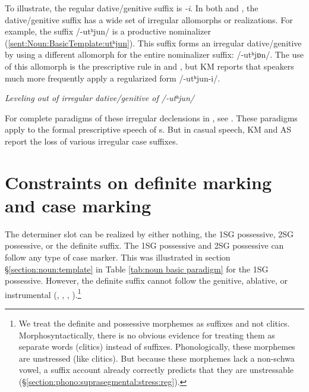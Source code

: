 To illustrate, the regular dative/genitive suffix is \textit{-i}. In both {\seaSE} and {\iaIA}, the dative/genitive suffix has a wide set of irregular allomorphs or realizations. For example, the suffix  /{-utʰjun}/ is a productive nominalizer (\ref{sent:Noun:BasicTemplate:utʰjun}). This suffix forms an irregular dative/genitive by using a different allomorph for the entire nominalizer suffix:  /{-utʰjɒn}/. The use of this    allomorph is the prescriptive rule in {\seaSE} and {\iaIA}, but KM reports that {\iaIA} speakers much more frequently apply a regularized form /{-utʰjun-i}/. 



\begin{exe}
	\ex \textit{Leveling out of irregular dative/genitive of /{-utʰjun}/}
	\label{sent:Noun:BasicTemplate:utʰjun}
	
\end{exe}

For complete paradigms of these irregular declensions in {\seaSEA}, see \citet[\S2.1.2]{DumTragut-2009-ArmenianReferenceGrammar}. These paradigms apply to the formal prescriptive speech of {\iaIA}s.  But in casual speech, KM and AS report the loss of   various irregular case suffixes. 
\section{Constraints on definite marking and case marking}\label{section:noun:caseDefConstraint}


The determiner slot can be realized by either nothing, the 1SG possessive, 2SG possessive, or the definite suffix. The 1SG possessive  and 2SG possessive  can follow any type of case marker. This was illustrated in section \S\ref{section:noun:template} in Table \ref{tab:noun basic paradigm} for the 1SG possessive. However, the definite suffix cannot follow the genitive, ablative, or instrumental (\citealt[104]{DumTragut-2009-ArmenianReferenceGrammar}, \citealt[7]{Yeghiazaryan-2010-ArmenianCase}, \citealt[48]{Hodgson-2019-DissRelativeClauseArmenianSyntax}, \citeyear{Hodgson-202x-GrammaticaliztionDefiniteARticleArmenian}).\footnote{%
	We treat the definite and possessive morphemes as suffixes and not clitics. Morphosyntactically, there is no obvious evidence for treating them as separate words (clitics) instead of suffixes. Phonologically, these morphemes are unstressed (like clitics). But because these morphemes lack a non-schwa vowel, a suffix account already correctly predicts that they are unstressable (\S\ref{section:phono:suprasegmental:stress:reg}).   }


